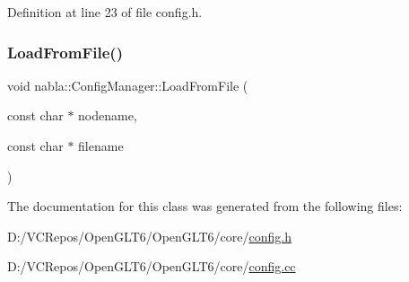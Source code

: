 Definition at line 23 of file config.\+h.

\mbox{\label{classnabla_1_1_config_manager_a020b971d5179f9e92dd95f426e68fba9}} 
\subsubsection{\texorpdfstring{LoadFromFile()}{LoadFromFile()}}
{\footnotesize\ttfamily void nabla\+::\+Config\+Manager\+::\+Load\+From\+File (\begin{DoxyParamCaption}\item[{const char $\ast$}]{nodename,  }\item[{const char $\ast$}]{filename }\end{DoxyParamCaption})\hspace{0.3cm}{\ttfamily [noexcept]}}



The documentation for this class was generated from the following files\+:\begin{DoxyCompactItemize}
\item 
D\+:/\+V\+C\+Repos/\+Open\+G\+L\+T6/\+Open\+G\+L\+T6/core/\mbox{\hyperlink{config_8h}{config.\+h}}\item 
D\+:/\+V\+C\+Repos/\+Open\+G\+L\+T6/\+Open\+G\+L\+T6/core/\mbox{\hyperlink{config_8cc}{config.\+cc}}\end{DoxyCompactItemize}
